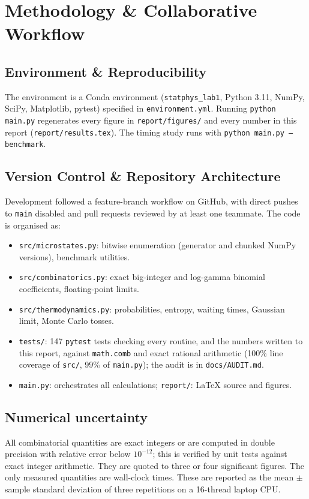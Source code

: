 \documentclass[11pt, a4paper]{article}
\begin{document}
\section{Methodology \& Collaborative Workflow}

\subsection{Environment \& Reproducibility}
The environment is a Conda environment (\texttt{statphys\_lab1}, Python 3.11, NumPy, SciPy, Matplotlib, pytest) specified in \texttt{environment.yml}. Running \texttt{python main.py} regenerates every figure in \texttt{report/figures/} and every number in this report (\texttt{report/results.tex}). The timing study runs with \texttt{python main.py --benchmark}.

\subsection{Version Control \& Repository Architecture}
Development followed a feature-branch workflow on GitHub, with direct pushes to \texttt{main} disabled and pull requests reviewed by at least one teammate. The code is organised as:
\begin{itemize}
    \item \texttt{src/microstates.py}: bitwise enumeration (generator and chunked NumPy versions), benchmark utilities.
    \item \texttt{src/combinatorics.py}: exact big-integer and log-gamma binomial coefficients, floating-point limits.
    \item \texttt{src/thermodynamics.py}: probabilities, entropy, waiting times, Gaussian limit, Monte Carlo tosses.
    \item \texttt{tests/}: 147 \texttt{pytest} tests checking every routine, and the numbers written to this report, against \texttt{math.comb} and exact rational arithmetic (100\% line coverage of \texttt{src/}, 99\% of \texttt{main.py}); the audit is in \texttt{docs/\allowbreak AUDIT.md}.
    \item \texttt{main.py}: orchestrates all calculations; \texttt{report/}: \LaTeX{} source and figures.
\end{itemize}

\subsection{Numerical uncertainty}
All combinatorial quantities are exact integers or are computed in double precision with relative error below $10^{-12}$; this is verified by unit tests against exact integer arithmetic. They are quoted to three or four significant figures. The only measured quantities are wall-clock times. These are reported as the mean $\pm$ sample standard deviation of three repetitions on a 16-thread laptop CPU.
\end{document}
